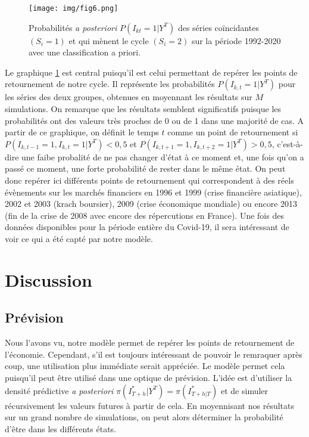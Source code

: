 \documentclass[10pt,french,french]{article}
\begin{document}
\begin{figure}
\centering
\texttt{[image: img/fig6.png]}
\caption{Probabilités \textit{a posteriori} $P(I_{kt}=1|Y^T)$ des séries coïncidantes $(S_i=1)$ et qui mènent le cycle $(S_i=2)$ sur la période 1992-2020 avec une classification a priori.}
\label{retournements}
\end{figure}

Le graphique \ref{retournements} est central puisqu'il est celui permettant de repérer les points de retournement de notre cycle. Il représente les probabilités \(P(I_{k,t} = 1|Y^T)\) pour les séries des deux groupes, obtenues en moyennant les résultats sur \(M\) simulations. On remarque que les résultats semblent significatifs puisque les probabilités ont des valeurs très proches de 0 ou de 1 dans une majorité de cas. A partir de ce graphique, on définit le temps \(t\) comme un point de retournement si \(P(I_{k,t-1} = 1, I_{k,t} = 1 | Y^T) < 0,5\) et \(P(I_{k,t+1} = 1, I_{k,t+2} = 1 | Y^T) > 0,5\), c'est-à-dire une faibe probalité de ne pas changer d'état à ce moment et, une fois qu'on a passé ce moment, une forte probabilité de rester dans le même état. On peut donc repérer ici différents points de retournement qui correspondent à des réels évènements sur les marchés financiers en 1996 et 1999 (crise financière asiatique), 2002 et 2003 (krach boursier), 2009 (crise économique mondiale) ou encore 2013 (fin de la crise de 2008 avec encore des répercutions en France). Une fois des données disponibles pour la période entière du Covid-19, il sera intéressant de voir ce qui a été capté par notre modèle.

\hypertarget{discussion}{%
\section{Discussion}\label{discussion}}

\hypertarget{pruxe9vision}{%
\subsection{Prévision}\label{pruxe9vision}}

Nous l'avons vu, notre modèle permet de repérer les points de retournement de l'économie. Cependant, s'il est toujours intéressant de pouvoir le remraquer après coup, une utilisation plus immédiate serait appréciée. Le modèle permet cela puisqu'il peut être utilisé dans une optique de prévision. L'idée est d'utiliser la densité prédictive \emph{a posteriori} \(\pi(I^*_{T+h}|Y^T) = \pi(I^*_{T+h|T})\) et de simuler récursivement les valeurs futures à partir de cela. En moyennisant nos résultats sur un grand nombre de simulations, on peut alors déterminer la probabilité d'être dans les différents états.
\end{document}
